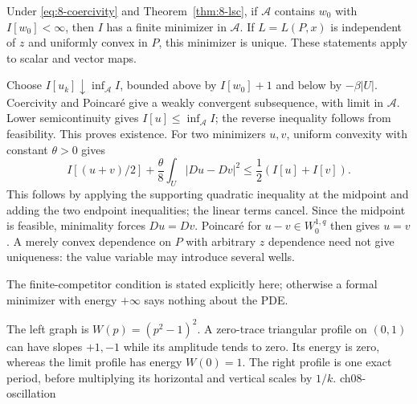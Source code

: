 \Needspace{55mm}
\begin{theorem}
\label{thm:8-direct}
Under \eqref{eq:8-coercivity} and Theorem~\ref{thm:8-lsc}, if
$\mathcal A$ contains $w_0$ with $I[w_0]<\infty$, then $I$ has a
finite minimizer in $\mathcal A$.
If $L=L(P,x)$ is independent of $z$ and uniformly convex in $P$, this
minimizer is unique. These statements apply to scalar and vector maps.
\end{theorem}
\begin{expandedproof}
Choose $I[u_k]\downarrow\inf_{\mathcal A}I$, bounded above by
$I[w_0]+1$ and below by $-\beta|U|$. Coercivity and Poincar\'e give a
weakly convergent subsequence, with limit in $\mathcal A$.
Lower semicontinuity gives $I[u]\leq\inf_{\mathcal A}I$; the reverse
inequality follows from feasibility. This proves existence.
For two minimizers $u,v$, uniform convexity with constant $\theta>0$ gives
\[
 I[(u+v)/2]+\frac\theta8\int_U|Du-Dv|^2
 \leq\frac12(I[u]+I[v]).
\]
This follows by applying the supporting quadratic inequality at the
midpoint and adding the two endpoint inequalities; the linear terms
cancel. Since the midpoint is feasible, minimality forces $Du=Dv$.
Poincar\'e for $u-v\in W^{1,q}_0$ then gives $u=v$.
A merely convex dependence on $P$ with arbitrary $z$ dependence need
not give uniqueness: the value variable may introduce several wells.
\end{expandedproof}
The finite-competitor condition is stated explicitly here; otherwise a
formal minimizer with energy $+\infty$ says nothing about the PDE.

{The left graph is $W(p)=(p^2-1)^2$. A zero-trace triangular profile on $(0,1)$ can have slopes $+1,-1$ while its amplitude tends to zero. Its energy is zero, whereas the limit profile has energy $W(0)=1$. The right profile is one exact period, before multiplying its horizontal and vertical scales by $1/k$.}
{ch08-oscillation}

\Needspace{45mm}
